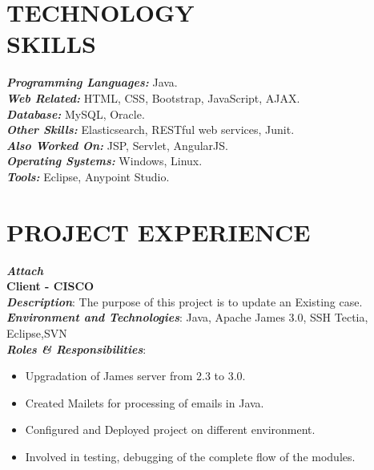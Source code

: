 \documentclass[margin, 10pt]{res} %
\begin{document}
\begin{resume}
\section{TECHNOLOGY \\ SKILLS} 
{\sl \textbf{Programming Languages:}} Java. \\
{\sl \textbf{Web Related:}} HTML, CSS, Bootstrap, JavaScript, AJAX.  \\
{\sl \textbf{Database:}} MySQL, Oracle.   \\
{\sl \textbf{Other Skills:}} Elasticsearch, RESTful web services, Junit.  \\
{\sl \textbf{Also Worked On:}} JSP, Servlet, AngularJS.   \\
{\sl \textbf{Operating Systems:}} Windows, Linux.   \\
{\sl \textbf{Tools:}} Eclipse, Anypoint Studio.
 
 
\section{PROJECT EXPERIENCE}
{\sl \textbf{Attach}} \hfill  \\
\textbf{Client - CISCO} \\
\textbf{\textit{Description}}: The purpose of this project is to update an Existing case.   \\
\textbf{\textit{Environment and Technologies}}: Java, Apache James 3.0, SSH Tectia, Eclipse,SVN \\
\textbf{\textit{Roles \& Responsibilities}}:  
\begin{itemize}
\item	Upgradation of James server from 2.3 to 3.0.  
\item	Created Mailets for processing of emails in Java.  
\item	Configured and Deployed project on different environment.  
\item Involved in testing, debugging of the complete flow of the modules.   
\end{itemize} 


\end{resume}
\end{document}
